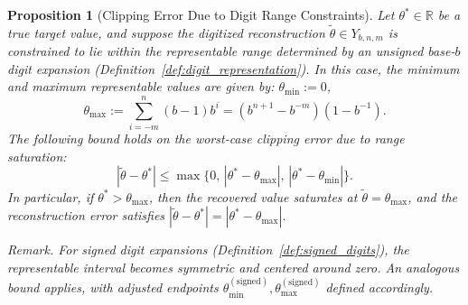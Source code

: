 \documentclass[aps,twocolumn,superscriptaddress,nofootinbib]{revtex4}
\newtheorem{proposition}{Proposition}
\begin{document}
\begin{proposition}[Clipping Error Due to Digit Range Constraints]
\label{prop:clipping}
Let \( \theta^* \in \mathbb{R} \) be a true target value, and suppose the digitized reconstruction \( \tilde{\theta} \in Y_{b,n,m} \) is constrained to lie within the representable range determined by an \emph{unsigned} base-\( b \) digit expansion (Definition~\ref{def:digit_representation}). In this case, the minimum and maximum representable values are given by: $\theta_{\min} := 0$,
\[
\theta_{\max} := \sum_{i=-m}^{n} (b-1) b^i = (b^{n+1} - b^{-m})(1 - b^{-1}).
\]
The following bound holds on the worst-case clipping error due to range saturation:
\begin{equation}
|\tilde{\theta} - \theta^*| \leq \max \big\{ 0,\, |\theta^* - \theta_{\max}|,\, |\theta^* - \theta_{\min}| \big\}.
\end{equation}
In particular, if \( \theta^* > \theta_{\max} \), then the recovered value saturates at \( \tilde{\theta} = \theta_{\max} \), and the reconstruction error satisfies \( |\tilde{\theta} - \theta^*| = |\theta^* - \theta_{\max}| \).

\medskip

\noindent
\textit{Remark.} For signed digit expansions (Definition~\ref{def:signed_digits}), the representable interval becomes symmetric and centered around zero. An analogous bound applies, with adjusted endpoints \( \theta_{\min}^{\mathrm{(signed)}}, \theta_{\max}^{\mathrm{(signed)}} \) defined accordingly.
\end{proposition}
\end{document}
